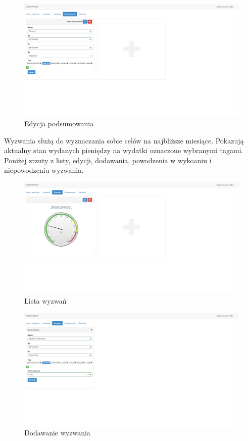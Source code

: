 \documentclass[10pt,titlepage]{article}
\begin{document}
\begin{figure}[H]
  \centering
  \includegraphics[scale=0.2]{images/screen_podsumowaniaEdycja.png}
  \caption{Edycja podsumowania}
  \label{screen:editSummary}
\end{figure}
\par Wyzwania służą do wyznaczania sobie celów na najbliższe miesiące. Pokazują aktualny stan wydanych pieniędzy na wydatki oznaczone wybranymi tagami. Poniżej zrzuty z listy, edycji, dodawania, powodzenia w wykoaniu i niepowodzeniu wyzwania.
\begin{figure}[H]
  \centering
  \includegraphics[scale=0.2]{images/screen_wyzwania.png}
  \caption{Lista wyzwań}
\end{figure}
\begin{figure}[H]
  \centering
  \includegraphics[scale=0.2]{images/screen_wyzwaniaDodaj.png}
  \caption{Dodawanie wyzwania}
\end{figure}
\end{document}

